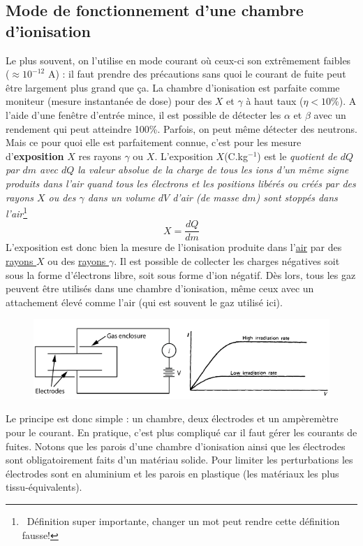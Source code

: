 	\subsection{Mode de fonctionnement d'une chambre d'ionisation}
	Le plus souvent, on l'utilise en mode courant où ceux-ci son extrêmement faibles ($\approx 
	10^{-12}$ A) : il faut prendre des précautions sans quoi le courant de fuite peut être 
	largement plus grand que ça. La chambre d'ionisation est parfaite comme moniteur (mesure
	instantanée de dose) pour des $X$ et $\gamma$ à haut taux ($\eta < 10\%$). A l'aide d'une 
	fenêtre d'entrée mince, il est possible de détecter les $\alpha$ et $\beta$ avec un 
	rendement qui peut atteindre 100\%. Parfois, on peut même détecter des neutrons.\\
	
	Mais ce pour quoi elle est parfaitement connue, c'est pour les mesure d'\textbf{exposition} 
	$X$ res rayons $\gamma$ ou $X$. L'exposition $X$(C.kg$^{-1}$) est le \textit{quotient de $dQ$ 
	par $dm$ avec $dQ$ la valeur absolue de la charge de tous les ions d'un même signe produits dans
	l'air quand tous les électrons et les positions libérés ou créés par des rayons $X$ ou des 
	$\gamma$ dans un volume $dV$ d'air (de masse $dm$) sont stoppés dans l'air}\footnote{\danger\
	Définition super importante, changer un mot peut rendre cette définition fausse!}
	\begin{equation}
	X=\frac{dQ}{dm} 
	\end{equation}
	L'exposition est donc bien la mesure de l'ionisation produite dans l'\underline{air} par 
	des \underline{rayons $X$} ou des \underline{rayons $\gamma$}. Il est possible de collecter
	les charges négatives soit sous la forme d'électrons libre, soit sous forme d'ion négatif. 
	Dès lors, tous les gaz peuvent être utilisés dans une chambre d'ionisation, même ceux avec
	un attachement élevé comme l'air (qui est souvent le gaz utilisé ici).\\
	
	\begin{figure}
	\vspace{-5mm}
	\includegraphics[scale=0.35]{ch8/image2}
	\end{figure}
	Le principe est donc simple : un chambre, deux électrodes et un ampèremètre pour le courant. 
	En pratique, c'est plus compliqué car il faut gérer les courants de fuites. Notons que 
	les parois d'une chambre d'ionisation ainsi que les électrodes sont obligatoirement faits d'un
	matériau solide. Pour limiter les perturbations les électrodes sont en aluminium et les parois 
	en plastique (les matériaux les plus tissu-équivalents).
	

